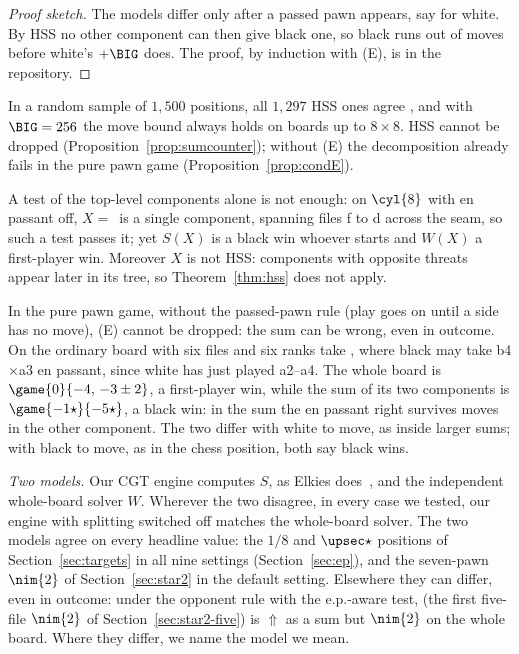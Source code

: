 \begin{proof}[Proof sketch]
The models differ only after a passed pawn appears, say for white. By HSS no other component can then give black
one, so black runs out of moves before white's $+\BIG$ does. The proof, by induction with (E),
is in the repository.
\end{proof}

In a random sample of $1{,}500$ positions, all $1{,}297$ HSS ones agree , and with $\BIG=256$ the move
bound always holds on boards up to $8\times8$. HSS cannot be dropped (Proposition~\ref{prop:sumcounter});
without (E) the decomposition already fails in the pure pawn game (Proposition~\ref{prop:condE}).

\begin{proposition}[\lab{C2}]\label{prop:sumcounter}
A test of the top-level components alone is not enough: on $\cyl{8}$ with en passant off, $X=$\, is a single component, spanning files f to d across the seam, so such a test passes it; yet
$S(X)$ is a black win whoever starts and $W(X)$ a first-player win. Moreover $X$ is not HSS: components with
opposite threats appear later in its tree, so Theorem~\ref{thm:hss} does not apply.
\end{proposition}

\begin{proposition}[\lab{C1}]\label{prop:condE}
In the pure pawn game, without the passed-pawn rule (play goes on until a side has no move), (E) cannot
be dropped: the sum can be wrong, even in outcome. On the ordinary board with six files and six ranks take
, where black may take b4$\times$a3 en passant, since white has just played a2--a4. The
whole board is $\game{0}{-4,\,-3\pm2}$, a first-player win, while the sum of its two components is
$\game{-1\star}{-5\star}$, a black win: in the sum the en passant right survives moves in the other component. The two differ
with white to move, as inside larger sums; with black to move, as in the chess position,
both say black wins.
\end{proposition}

\emph{Two models.} Our CGT engine computes $S$, as Elkies does~\cite{Elkies1996}, and the independent
whole-board solver $W$. Wherever the two disagree, in every case we tested,
our engine with splitting switched off matches the whole-board solver. The two models agree on every headline value: the $1/8$ and $\upsec\star$
positions of Section~\ref{sec:targets} in all nine settings (Section~\ref{sec:ep}), and the seven-pawn $\nim{2}$
of Section~\ref{sec:star2} in the default setting. Elsewhere they can differ, even in outcome: under the
opponent rule with the e.p.-aware test,  (the first five-file $\nim{2}$ of
Section~\ref{sec:star2-five}) is ${\Uparrow}$ as a sum but $\nim{2}$ on the whole board. Where they differ, we name the model we mean.
